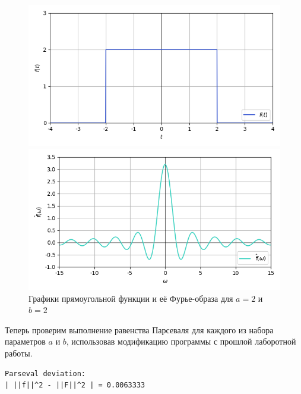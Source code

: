\documentclass[a4paper]{article}
\begin{document}
\begin{figure}[H]
    \begin{minipage}{0.5\textwidth}
        \centering \includegraphics[width=\textwidth]{sources/1_rectangular/graph_3.png}
    \end{minipage}\hfill
    \begin{minipage}{0.5\textwidth}
        \centering \includegraphics[width=\textwidth]{sources/1_rectangular/fourier_3.png}
    \end{minipage}
    \caption{Графики прямоугольной функции и её Фурье-образа для $a = 2$ и $b = 2$} 
\end{figure}
\noindent Теперь проверим выполнение равенства Парсеваля для каждого из набора параметров $a$ и $b$, использовав модификацию программы с прошлой лаборотной работы.\\
\begin{minipage}{0.33\textwidth}
\begin{lstlisting}[caption={$a = 1$, $b = 1$}]
Parseval deviation:
| ||f||^2 - ||F||^2 | = 0.0063333
\end{lstlisting}
\end{minipage}\hfill
\end{document}
